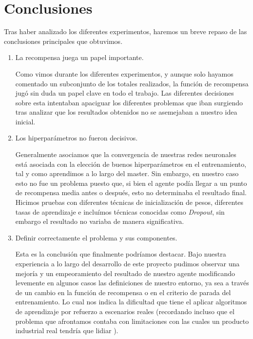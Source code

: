 
\chapter{Conclusiones}
\label{conclusiones}

Tras haber analizado los diferentes experimentos, haremos un breve repaso de las conclusiones principales que obtuvimos.

\begin{enumerate}[label=\destacado{\arabic*.}]
  \setlength\itemsep{1em}
  \item La recompensa juega un papel importante.
  \medskip

  Como vimos durante los diferentes experimentos, y aunque solo hayamos comentado un subconjunto de los totales realizados, la función de recompensa jugó sin duda un papel clave en todo el trabajo. Las diferentes decisiones sobre esta intentaban apaciguar los diferentes problemas que iban surgiendo tras analizar que los resultados obtenidos no se asemejaban a nuestro idea inicial.
  \medskip

  \item Los hiperparámetros no fueron decisivos.
  \medskip

  Generalmente asociamos que la convergencia de nuestras redes neuronales está asociada con la elección de buenos hiperparámetros en el entrenamiento, tal y como aprendimos a lo largo del master. Sin embargo, en nuestro caso esto no fue un problema puesto que, si bien el agente podía llegar a un punto de recompensa media antes o después, esto no determinaba el resultado final. Hicimos pruebas con diferentes técnicas de inicialización de pesos, diferentes tasas de aprendizaje e incluímos técnicas conocidas como \textit{Dropout}, sin embargo el resultado no variaba de manera significativa.
  \medskip

  \item Definir correctamente el problema y sus componentes.
  
  \medskip
  Esta es la conclusión que finalmente podríamos destacar. Bajo nuestra experiencia a lo largo del desarrollo de este proyecto pudimos observar una mejoría y un empeoramiento del resultado de nuestro agente modificando levemente en algunos casos las definiciones de nuestro entorno, ya sea a través de un cambio en la función de recompensa o en el criterio de parada del entrenamiento. Lo cual nos indica la dificultad que tiene el aplicar algoritmos de aprendizaje por refuerzo a escenarios reales (recordando incluso que el problema que afrontamos contaba con limitaciones con las cuales un producto industrial real tendría que lidiar ).
  \medskip

\end{enumerate}
